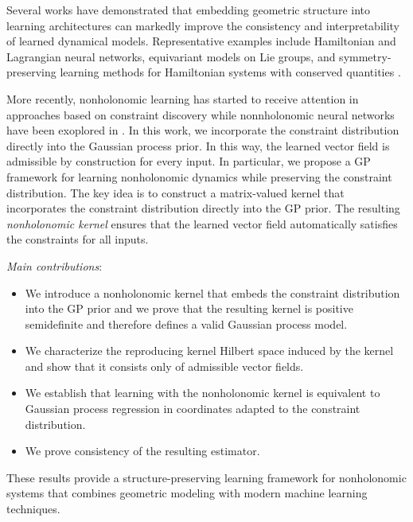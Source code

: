 \documentclass[letterpaper, 10 pt, conference]{ieeeconf}
\begin{document}
Several works have demonstrated that embedding geometric structure into learning architectures can markedly improve the consistency and interpretability of learned dynamical models. Representative examples include Hamiltonian and Lagrangian neural networks, equivariant models on Lie groups, and symmetry-preserving learning methods for Hamiltonian systems with conserved quantities \cite{Greydanus2019,Jin2020,Zhong2020,Cranmer2020,Finzi2020,Vaquero2024,Eldred2024,beckers2022gaussian}. 


More recently, nonholonomic learning has started to receive attention in approaches based on constraint discovery \cite{Wang2024} while nonnholonomic neural networks have been exoplored in \cite{diaz2025lagrangian}. In this work, we incorporate the constraint distribution directly into the Gaussian process prior. In this way, the learned vector field is admissible by construction for every input. In particular, we propose a GP framework for learning nonholonomic dynamics while preserving the constraint distribution. The key idea is to construct a matrix-valued kernel that incorporates the constraint distribution directly into the GP prior. The resulting \emph{nonholonomic kernel} ensures that the learned vector field automatically satisfies the constraints for all inputs.

\textit{Main contributions}: \begin{itemize}
\item We introduce a nonholonomic kernel that embeds the constraint distribution into the GP prior and we prove that the resulting kernel is positive semidefinite and therefore defines a valid Gaussian process model.

\item We characterize the reproducing kernel Hilbert space induced by the kernel and show that it consists only of admissible vector fields.

\item We establish that learning with the nonholonomic kernel is equivalent to Gaussian process regression in coordinates adapted to the constraint distribution.

\item We prove consistency of the resulting estimator.

\end{itemize}

These results provide a structure-preserving learning framework for nonholonomic systems that combines geometric modeling with modern machine learning techniques. 
\end{document}
